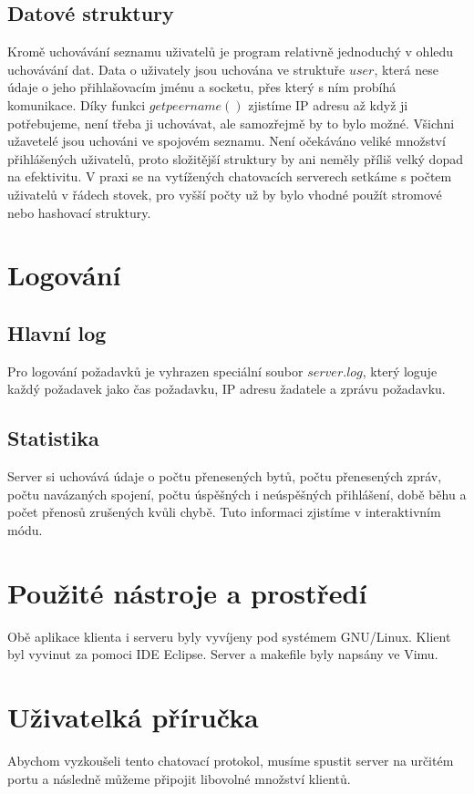 \documentclass[12pt,titlepage]{article}
\begin{document}
\subsection{Datové struktury}
Kromě uchovávání seznamu uživatelů je program relativně jednoduchý v ohledu
uchovávání dat. Data o uživately jsou uchována ve struktuře $user$, která nese
údaje o jeho přihlašovacím jménu a socketu, přes který s ním probíhá
komunikace. Díky funkci $getpeername()$ zjistíme IP adresu až když ji
potřebujeme, není třeba ji uchovávat, ale samozřejmě by to bylo možné.  Všichni
užavetelé jsou uchováni ve spojovém seznamu. Není očekáváno veliké množství
přihlášených uživatelů, proto složitější struktury by ani neměly příliš velký
dopad na efektivitu. V praxi se na vytížených chatovacích serverech setkáme s
počtem uživatelů v řádech stovek, pro vyšší počty už by bylo vhodné použít
stromové nebo hashovací struktury.


\section{Logování}
\subsection{Hlavní log}
Pro logování požadavků je vyhrazen speciální
soubor $server.log$, který loguje každý požadavek jako čas požadavku, IP adresu
žadatele a zprávu požadavku.

\subsection{Statistika}
Server si uchovává údaje o počtu přenesených bytů, počtu přenesených zpráv,
počtu navázaných spojení, počtu úspěšných i neúspěšných přihlášení, době běhu a
počet přenosů zrušených kvůli chybě. Tuto informaci zjistíme v interaktivním
módu. 

\section{Použité nástroje a prostředí}
Obě aplikace klienta i serveru byly vyvíjeny pod systémem GNU/Linux. Klient byl
vyvinut za pomoci IDE Eclipse. Server a makefile byly napsány ve Vimu.


\section{Uživatelká příručka}
Abychom vyzkoušeli tento chatovací protokol, musíme spustit server na určitém
portu a následně můžeme připojit libovolné množství klientů.
\end{document}
